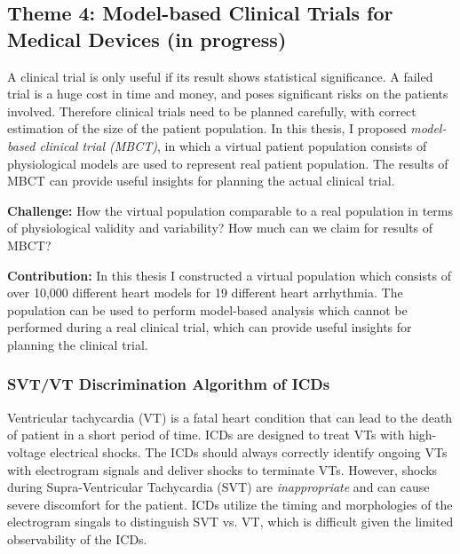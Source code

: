 \documentclass[a4paper,11pt]{article}
\begin{document}
\subsection{Theme 4: Model-based Clinical Trials for Medical Devices (in progress)}
A clinical trial is only useful if its result shows statistical significance.
A failed trial is a huge cost in time and money, and poses significant risks on the patients involved.
Therefore clinical trials need to be planned carefully, with correct estimation of the size of the patient population.
In this thesis, I proposed \emph{model-based clinical trial (MBCT)}, in which a virtual patient population consists of physiological models are used to represent  real patient population. 
The results of MBCT can provide useful insights for planning the actual clinical trial.


\noindent\textbf{Challenge:} How the virtual population comparable to a real population in terms of physiological validity and variability? How much can we claim for results of MBCT?

\noindent\textbf{Contribution:} In this thesis I constructed a virtual population which consists of over 10,000 different heart models for 19 different heart arrhythmia.
The population can be used to perform model-based analysis which cannot be performed during a real clinical trial, which can provide useful insights for planning the clinical trial.

\subsubsection{SVT/VT Discrimination Algorithm of ICDs}
Ventricular tachycardia (VT) is a fatal heart condition that can lead to the death of patient in a short period of time.
ICDs are designed to treat VTs with high-voltage electrical shocks.
The ICDs should always correctly identify ongoing VTs with electrogram signals and deliver shocks to terminate VTs.
However, shocks during Supra-Ventricular Tachycardia (SVT) are \emph{inappropriate} and can cause severe discomfort for the patient.
ICDs utilize the timing and morphologies of the electrogram singals to distinguish SVT vs. VT, which is difficult given the limited observability of the ICDs.
\end{document}
